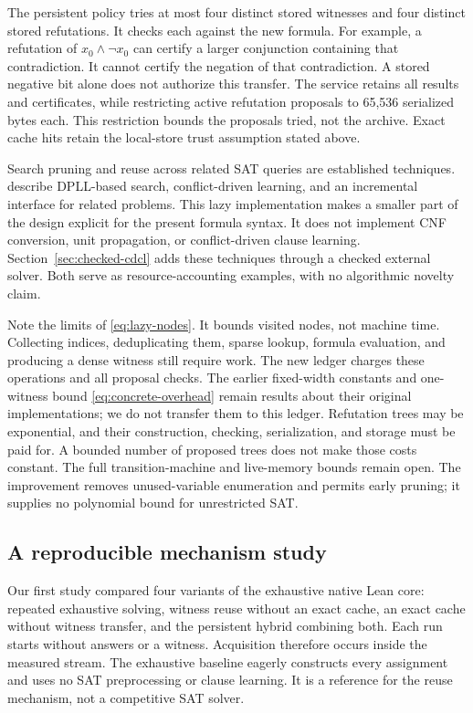 \documentclass[11pt,a4paper]{article}
\numberwithin{equation}{section}
\theoremstyle{plain}
\theoremstyle{definition}
\theoremstyle{remark}
\begin{document}
The persistent policy tries at most four distinct stored witnesses and four distinct stored refutations. It checks each against the new formula. For example, a refutation of $x_0\land\neg x_0$ can certify a larger conjunction containing that contradiction. It cannot certify the negation of that contradiction. A stored negative bit alone does not authorize this transfer. The service retains all results and certificates, while restricting active refutation proposals to 65,536 serialized bytes each. This restriction bounds the proposals tried, not the archive. Exact cache hits retain the local-store trust assumption stated above.

Search pruning and reuse across related SAT queries are established techniques. \citet{een2003extensible} describe DPLL-based search, conflict-driven learning, and an incremental interface for related problems. This lazy implementation makes a smaller part of the design explicit for the present formula syntax. It does not implement CNF conversion, unit propagation, or conflict-driven clause learning. Section~\ref{sec:checked-cdcl} adds these techniques through a checked external solver. Both serve as resource-accounting examples, with no algorithmic novelty claim.

Note the limits of \eqref{eq:lazy-nodes}. It bounds visited nodes, not machine time. Collecting indices, deduplicating them, sparse lookup, formula evaluation, and producing a dense witness still require work. The new ledger charges these operations and all proposal checks. The earlier fixed-width constants and one-witness bound \eqref{eq:concrete-overhead} remain results about their original implementations; we do not transfer them to this ledger. Refutation trees may be exponential, and their construction, checking, serialization, and storage must be paid for. A bounded number of proposed trees does not make those costs constant. The full transition-machine and live-memory bounds remain open. The improvement removes unused-variable enumeration and permits early pruning; it supplies no polynomial bound for unrestricted SAT.

\subsection{A reproducible mechanism study}
\label{sec:mechanism-study}

Our first study compared four variants of the exhaustive native Lean core: repeated exhaustive solving, witness reuse without an exact cache, an exact cache without witness transfer, and the persistent hybrid combining both. Each run starts without answers or a witness. Acquisition therefore occurs inside the measured stream. The exhaustive baseline eagerly constructs every assignment and uses no SAT preprocessing or clause learning. It is a reference for the reuse mechanism, not a competitive SAT solver.
\end{document}
